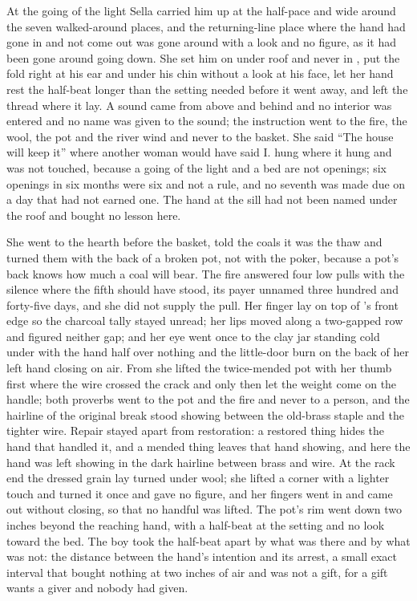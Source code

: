 At the going of the light Sella carried him up at the half-pace and wide around the seven walked-around places, and the returning-line place where the hand had gone in and not come out was gone around with a look and no figure, as it had been gone around going down. She set him on  under  roof and never in , put the fold right at his ear and under his chin without a look at his face, let her hand rest the half-beat longer than the setting needed before it went away, and left the thread where it lay. A sound came from above and behind and no interior was entered and no name was given to the sound; the instruction went to the fire, the wool, the pot and the river wind and never to the basket. She said “The house will keep it” where another woman would have said I.  hung where it hung and was not touched, because a going of the light and a bed are not openings; six openings in six months were six and not a rule, and no seventh was made due on a day that had not earned one. The hand at the sill had not been named under the roof and bought no lesson here.

She went to the hearth before the basket, told the coals it was the thaw and turned them with the back of a broken pot, not with the poker, because a pot's back knows how much a coal will bear. The fire answered four low pulls with the silence where the fifth should have stood, its payer unnamed three hundred and forty-five days, and she did not supply the pull. Her finger lay on top of 's front edge so the charcoal tally stayed unread; her lips moved along a two-gapped row and figured neither gap; and her eye went once to the clay jar standing cold under  with the hand half over nothing and the little-door burn on the back of her left hand closing on air. From  she lifted the twice-mended pot with her thumb first where the wire crossed the crack and only then let the weight come on the handle; both proverbs went to the pot and the fire and never to a person, and the hairline of the original break stood showing between the old-brass staple and the tighter wire. Repair stayed apart from restoration: a restored thing hides the hand that handled it, and a mended thing leaves that hand showing, and here the hand was left showing in the dark hairline between brass and wire. At the rack end the dressed grain lay turned under wool; she lifted a corner with a lighter touch and turned it once and gave no figure, and her fingers went in and came out without closing, so that no handful was lifted. The pot's rim went down two inches beyond the reaching hand, with a half-beat at the setting and no look toward the bed. The boy took the half-beat apart by what was there and by what was not: the distance between the hand's intention and its arrest, a small exact interval that bought nothing at two inches of air and was not a gift, for a gift wants a giver and nobody had given.

